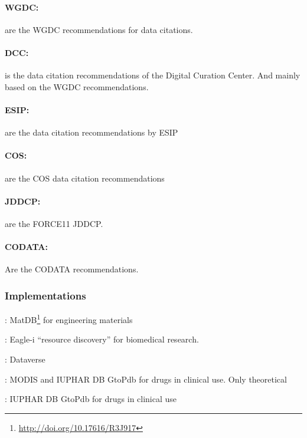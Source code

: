 \documentclass[letterpaper, parskip=half]{scrartcl}
\begin{document}
\paragraph{\acrlong{WGDC}:}
\citep{Rauber2015} are the \gls{WGDC} recommendations for data citations.

\paragraph{\acrlong{DCC}:}
\citep{Ball2015} is the data citation recommendations of the Digital Curation Center. And mainly based on the \gls{WGDC} recommendations.

\paragraph{\acrlong{ESIP}:}
\citep{ESIP2012a} are the data citation recommendations by \gls{ESIP}

\paragraph{\acrlong{COS}:}
\citep{COS2015} are the \gls{COS} data citation recommendations

\paragraph{\acrlong{JDDCP}:}
\citep{Altman2015, Rauber2015, Fenner2016, Starr2015} are the FORCE11 \gls{JDDCP}.

\paragraph{\acrlong{CODATA}:}
\citep{CODATA2013} Are the \gls{CODATA} recommendations.

\subsubsection{Implementations}

\citep{Austin2016}: MatDB\footnote{\url{http://doi.org/10.17616/R3J917}} for engineering materials 

\citep{Alawini2017}: Eagle-i ``resource discovery'' for biomedical research.

\citep{Crosas2011}: Dataverse

\citep{Buneman2016}: \gls{MODIS} and IUPHAR DB GtoPdb for drugs in clinical use. Only theoretical

\citep{Buneman2010}: IUPHAR DB GtoPdb for drugs in clinical use
\end{document}
